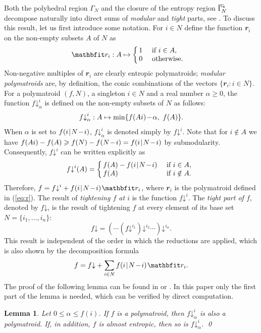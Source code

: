 \documentclass[reqno]{amsart}
\makeatletter
\newtheorem{lemma}[theorem]{Lemma}
\theoremstyle{definition}
\renewenvironment{cases}{\left\{\mkern-6mu\begin{array}{l@{~~~}l}}{\end{array}\right.}
\newcommand\tsp{\mkern 1.5mu}
\def\|{\mkern1.5mu{|}\mkern1.5mu}
\renewcommand\ge{\geqslant}\renewcommand\le{\leqslant}
\def\r{\mathbfit r}
\newcommand\dn{\mathord{\downarrow}}
\def\m#1{\tsp{#1}\tsp}
\def\sm{\tsp{-}\tsp} %
\def\G#1{\Gamma_{\!#1}}
\def\barGamma{\mkern1mu\overline{\hbox{$\mkern-1mu\Gamma\mkern4mu$}}\mkern-4mu}
\def\clGa#1{\barGamma^*_{\!#1}}
\makeatother
\begin{document}
Both the polyhedral region $\G N$ and the closure of the entropy region
$\clGa N$ decompose naturally into direct sums of \emph{modular} and
\emph{tight} parts, see \cite{entreg}. To discuss this result, let us first
introduce some notation. For $i\in N$ define the function $\r_i$ on the
non-empty subsets $A$ of $N$ as
\begin{equation}\label{eq:r}
   \r_i: A \mapsto \begin{cases}
      1 & \mbox{ if } i\in A,\\
      0 & \mbox{ otherwise. }
   \end{cases}
\end{equation}
Non-negative multiples of $\r_i$ are clearly entropic polymatroids;
\emph{modular polymatroids} are, by definition, the conic combinations of
the vectors $\{\r_i:i\in N\}$. For a polymatroid $(f,N)$, a singleton $i\in
N$ and a real number $\alpha\ge 0$, the function $f\dn^i_\alpha$ is defined
on the non-empty subsets of $N$ as follows:
$$
  f\dn^i_\alpha : A\mapsto \min\{f(Ai)\m-\alpha, ~f(A)\}.
$$
When $\alpha$ is set to $f(i\|N\sm i)$, $f\dn^i_\alpha$ is denoted simply by
$f\dn^i$. Note that for $i\notin A$ we have $f(Ai)-f(A)\ge f(N)-f(N\sm i)
=f(i\|N\sm i)$ by submodularity. Consequently, $f\dn^i$ can be written
explicitly as
$$
   f\dn^i (A) = \begin{cases}
      f(A)-f(i\|N\sm i) & \mbox{ if } i \in A, \\
      f(A)              & \mbox{ if } i\notin A.
   \end{cases}
$$
Therefore, $f= f\dn^i + f(i\|N\sm i)\tsp\r_i$, where $\r_i$ is the
polymatroid defined in (\ref{eq:r}). The result of \emph{tightening $f$ at
$i$} is the function $f\dn^i$. The \emph{tight part of $f$}, denoted by
$f\dn$, is the result of tightening $f$ at every element of its base set
$N=\{i_1,\dots,i_n\}$:
$$
    f\dn = (\cdots(f\dn^{i_1})\dn^{i_2} \cdots )\dn^{i_n}.
$$
This result is independent of the order in which the reductions are applied,
which is also shown by the decomposition formula
$$
   f = f\dn + \sum_{i\in N} f(i\|N\sm i)\tsp \r_i .
$$
The proof of the following lemma can be found in \cite{exploring} or
\cite{M.twocon}. In this paper only the first part of the lemma is needed,
which can be verified by direct computation.

\begin{lemma}\label{lemma:down}
Let $0\le \alpha\le f(i)$. 
If $f$ is a polymatroid, then $f\dn^i_\alpha$ is also a polymatroid.
If, in addition, $f$ is almost entropic, then so is $f\dn^i_\alpha$.
\qed
\end{lemma}
\end{document}

